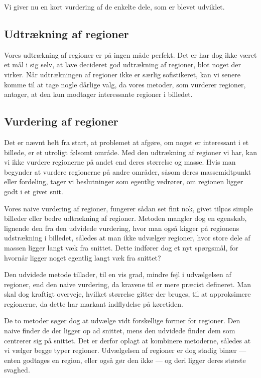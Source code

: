 {
{\sffamily Vi giver nu en kort vurdering af de enkelte dele, som er
blevet udviklet.
}

\subsection{Udtrækning af regioner}
Vores udtrækning af regioner er på ingen måde perfekt. Det er har dog
ikke været et mål i sig selv, at lave decideret god udtrækning af
regioner, blot noget der virker. Når udtrækningen af regioner ikke er
særlig sofistikeret, kan vi senere komme til at tage nogle dårlige valg,
da vores metoder, som vurderer regioner, antager, at den kun modtager
interessante regioner i billedet.

\subsection{Vurdering af regioner}
Det er nævnt helt fra start, at problemet at afgøre, om noget er
interessant i et billede, er et utroligt følsomt område. Med den
udtrækning af regioner vi har, kan vi ikke vurdere regionerne på andet
end deres størrelse og masse. Hvis man begynder at vurdere regionerne på
andre områder, såsom deres massemidtpunkt eller fordeling, tager vi
beslutninger som egentlig vedrører, om regionen ligger godt i et givet
snit.

Vores naive vurdering af regioner, fungerer sådan set fint nok, givet
tilpas simple billeder eller bedre udtrækning af regioner. Metoden
mangler dog en egenskab, lignende den fra den udvidede vurdering, hvor
man også kigger på regionens udstrækning i billedet, således at man ikke
udvælger regioner, hvor store dele af massen ligger langt væk fra
snittet. Dette indfører dog et nyt spørgsmål, for hvornår ligger noget
egentlig langt væk fra snittet?

Den udvidede metode tillader, til en vis grad, mindre fejl i udvælgelsen
af regioner, end den naive vurdering, da kravene til er mere præcist
defineret. Man skal dog kraftigt overveje, hvilket størrelse gitter der
bruges, til at approksimere regionerne, da dette har markant indflydelse
på køretiden.

De to metoder søger dog at udvælge vidt forskellige former for regioner.
Den naive finder de der ligger op ad snittet, mens den udvidede finder
dem som centrerer sig på snittet. Det er derfor oplagt at kombinere
metoderne, således at vi vælger begge typer regioner. Udvælgelsen af
regioner er dog stadig binær --- enten godtages en region, eller også
gør den ikke --- og deri ligger deres største svaghed.

}
